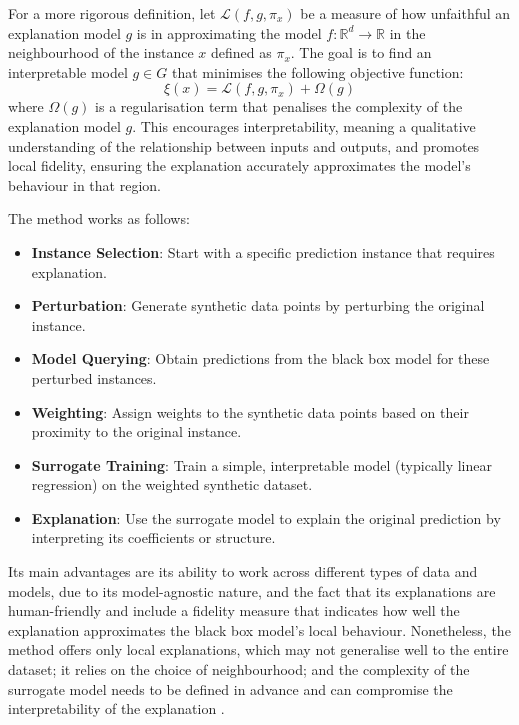 For a more rigorous definition, let $\mathcal{L}(f,g,\pi_x)$ be a measure of how unfaithful an explanation model $g$ is in approximating the model $f:\mathbb{R}^d \to \mathbb{R}$ in the neighbourhood of the instance $x$ defined as $\pi_x$. The goal is to find an interpretable model $g \in G$ that minimises the following objective function:
\begin{equation}
    \xi(x) = \mathcal{L}(f, g, \pi_x) + \Omega(g)
\end{equation}
where $\Omega(g)$ is a regularisation term that penalises the complexity of the explanation model $g$. This encourages interpretability, meaning a qualitative understanding of the relationship between inputs and outputs, and promotes local fidelity, ensuring the explanation accurately approximates the model's behaviour in that region. 

The method works as follows:
\begin{itemize}
    \item \textbf{Instance Selection}: Start with a specific prediction instance that requires explanation.
    \item \textbf{Perturbation}: Generate synthetic data points by perturbing the original instance.
    \item \textbf{Model Querying}: Obtain predictions from the black box model for these perturbed instances.
    \item \textbf{Weighting}: Assign weights to the synthetic data points based on their proximity to the original instance.
    \item \textbf{Surrogate Training}: Train a simple, interpretable model (typically linear regression) on the weighted synthetic dataset.
    \item \textbf{Explanation}: Use the surrogate model to explain the original prediction by interpreting its coefficients or structure.
\end{itemize}

Its main advantages are its ability to work across different types of data and models, due to its model-agnostic nature, and the fact that its explanations are human-friendly and include a fidelity measure that indicates how well the explanation approximates the black box model's local behaviour. Nonetheless, the method offers only local explanations, which may not generalise well to the entire dataset; it relies on the choice of neighbourhood; and the complexity of the surrogate model needs to be defined in advance and can compromise the interpretability of the explanation \cite{Molnar2025}.

